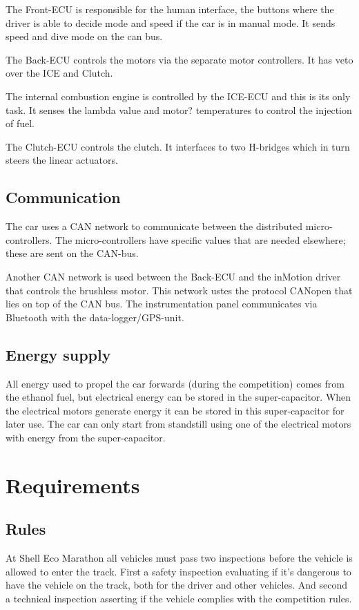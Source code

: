The Front-ECU is responsible for the human interface, the buttons where the driver is able to decide mode and speed if the car is in manual mode. It sends speed and dive mode on the can bus.

The Back-ECU controls the motors via the separate motor controllers. It has veto over the ICE and Clutch.

The internal combustion engine is controlled by the ICE-ECU and this is its only task. It senses the lambda value and motor? temperatures to control the injection of fuel.

The Clutch-ECU controls the clutch. It interfaces to two H-bridges which in turn steers the linear actuators.  

\subsection{Communication}
The car uses a CAN network to communicate between the distributed micro-controllers. The micro-controllers have specific values that are needed elsewhere; these are sent on the CAN-bus. 

Another CAN network is used between the Back-ECU and the inMotion driver that controls the brushless motor. This network ustes the protocol CANopen that lies on top of the CAN bus.
The instrumentation panel communicates via Bluetooth with the data-logger/GPS-unit.

\subsection{Energy supply}
All energy used to propel the car forwards (during the competition) comes from the ethanol fuel, but electrical energy can be stored in the super-capacitor. When the electrical motors generate energy it can be stored in this super-capacitor for later use. The car can only start from standstill using one of the electrical motors with energy from the super-capacitor.  

\section{Requirements}
\subsection{Rules}
At Shell Eco Marathon all vehicles must pass two inspections before the vehicle is allowed to enter the track. First a safety inspection evaluating if it's dangerous to have the vehicle on the track, both for the driver and other vehicles. And second a technical inspection asserting if the vehicle complies with the competition rules.

